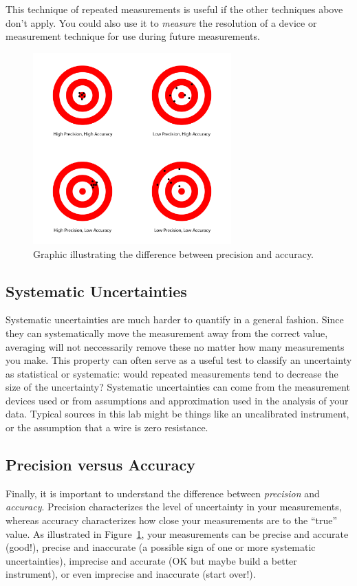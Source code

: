 This technique of repeated measurements is useful if the other techniques above
don't apply.  You could also use it to {\em measure} the resolution of a device
or measurement technique for use during future measurements. 

\begin{figure}
\includegraphics[width=3in]{../images/precision-accuracy.png}
\caption{Graphic illustrating the difference between precision and accuracy.}
\label{fig:precacc}
\end{figure}

\subsection{Systematic Uncertainties}

Systematic uncertainties are much harder to quantify in a general fashion.
Since they can systematically move the measurement away from the correct value,
averaging will not neccessarily remove these no matter how many measurements you
make.  This property can often serve as a useful test to classify an uncertainty
as statistical or systematic: would repeated measurements tend to decrease the
size of the uncertainty?  Systematic uncertainties can come from the measurement
devices used or from assumptions and approximation used in the analysis of your
data.  Typical sources in this lab might be things like an uncalibrated
instrument, or the assumption that a wire is zero resistance. 

\subsection{Precision versus Accuracy}

Finally, it is important to understand the difference between \textit{precision}
and \textit{accuracy}. Precision characterizes the level of uncertainty in your
measurements, whereas accuracy characterizes how close your measurements are to
the ``true'' value. As illustrated in
Figure~\ref{fig:precacc}, your measurements can be precise and accurate (good!),
precise and inaccurate (a possible sign of one or more systematic
uncertainties), imprecise and accurate (OK but maybe build a better instrument),
or even imprecise and inaccurate (start over!).

